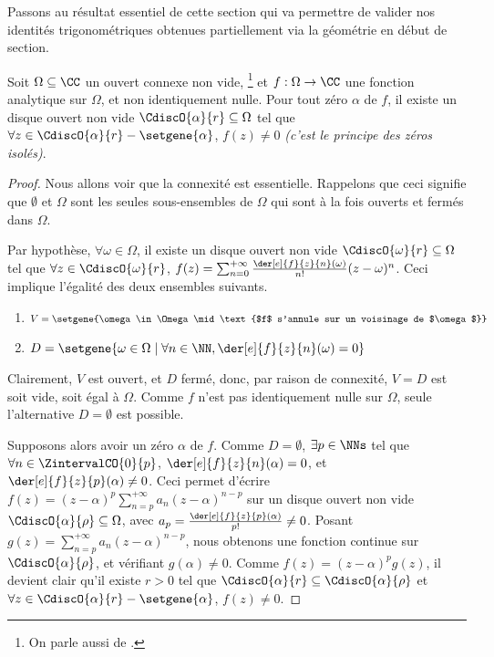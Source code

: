 

Passons au résultat essentiel de cette section qui va permettre de valider nos identités trigonométriques obtenues partiellement via la géométrie en début de section.


\begin{fact} \label{isolated-zero}
    Soit $\Omega \subseteq \CC$ un ouvert connexe non vide,%
    \footnote{
    	On parle aussi de .
    }
    et
    $f: \Omega \rightarrow \CC$ une fonction analytique sur $\Omega$, et non identiquement nulle.
	Pour tout zéro $\alpha$ de $f$, il existe un disque ouvert non vide $\CdiscO{\alpha}{r} \subseteq \Omega$ tel que 
	$\forall z \in \CdiscO{\alpha}{r} - \setgene{\alpha}$, $f(z) \neq 0$
	\emph{(c'est le principe des zéros isolés)}.  
\end{fact}


\begin{proof}
	Nous allons voir que la connexité est essentielle. Rappelons que ceci signifie que $\emptyset$ et $\Omega$ sont les seules sous-ensembles de $\Omega$ qui sont à la fois ouverts et fermés dans $\Omega$.
	
	\smallskip
	
	Par hypothèse, 
	$\forall \omega \in \Omega$, il existe un disque ouvert non vide $\CdiscO{\omega}{r} \subseteq \Omega$ tel que 
	$\forall z \in \CdiscO{\omega}{r}$, 
	$f(z) = \sum_{n = 0}^{+\infty} \frac{\der[e]{f}{z}{n}(\omega)}{n!} (z - \omega)^n$.
	Ceci implique l'égalité des deux ensembles suivants.
	\begin{enumerate}
		\item $V = \setgene{\omega \in \Omega \mid \text{$f$ s'annule sur un voisinage de $\omega$}}$

		\item $D = \setgene{\omega \in \Omega \mid \forall n \in \NN, \der[e]{f}{z}{n}(\omega) = 0}$
	\end{enumerate}
		
	Clairement,
	$V$ est ouvert, et $D$ fermé, donc, par raison de connexité, $V = D$ est soit vide, soit égal à $\Omega$.
	Comme $f$ n'est pas identiquement nulle sur $\Omega$, seule l'alternative $D = \emptyset$ est possible.

	\smallskip
	
	Supposons alors avoir un zéro $\alpha$ de $f$. 
	Comme $D = \emptyset$, $\exists p \in \NNs$ tel que 
	$\forall n \in \ZintervalCO{0}{p}$, $\der[e]{f}{z}{n}(\alpha) = 0$,
	et
	$\der[e]{f}{z}{p}(\alpha) \neq 0$.
	Ceci permet d'écrire
	$f(z) = (z - \alpha)^p \sum_{n = p}^{+\infty} a_n (z - \alpha)^{n - p}$
	sur un disque ouvert non vide $\CdiscO{\alpha}{\rho} \subseteq \Omega$,
	avec $a_p = \frac{\der[e]{f}{z}{p}(\alpha)}{p!} \neq 0$.
	Posant $g(z) = \sum_{n = p}^{+\infty} a_n (z - \alpha)^{n - p}$, nous obtenons une fonction continue sur $\CdiscO{\alpha}{\rho}$, et vérifiant $g(\alpha) \neq 0$.
	Comme $f(z) = (z - \alpha)^p g(z)$, il devient clair qu'il existe $r > 0$ tel que
	$\CdiscO{\alpha}{r} \subseteq \CdiscO{\alpha}{\rho}$
	et
	$\forall z \in \CdiscO{\alpha}{r} - \setgene{\alpha}$, $f(z) \neq 0$.
\end{proof}


